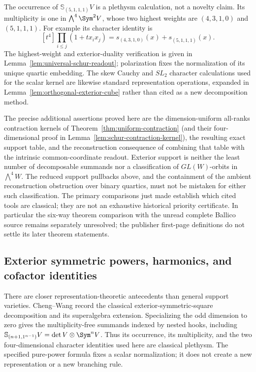 The occurrence of \(\mathbb S_{(5,1,1,1)}V\) is a plethysm
calculation, not a novelty claim.  Its multiplicity is one in
\(\bigwedge^4\Sym^2V\), whose two highest weights are
\((4,3,1,0)\) and \((5,1,1,1)\).  For example its character
identity is
\[
 [t^4]\prod_{i\le j}(1+t x_ix_j)
       =s_{(4,3,1,0)}(x)+s_{(5,1,1,1)}(x).
\]
The highest-weight and exterior-duality verification is given in
Lemma~\ref{lem:universal-schur-readout}; polarization fixes the
normalization of its unique quartic embedding.  The skew Cauchy and
\(SL_2\) character calculations used for the scalar kernel are likewise
standard representation operations, expanded in
Lemma~\ref{lem:orthogonal-exterior-cube} rather than cited as a
new decomposition method.

The precise additional assertions proved here are the dimension-uniform all-ranks
contraction kernels of Theorem~\ref{thm:uniform-contraction}
(and their four-dimensional proof in
Lemma~\ref{lem:schur-contraction-kernel}),
the resulting exact support table, and the reconstruction consequence
of combining that table with the intrinsic common-coordinate
readout.  Exterior support is neither the least number of decomposable
summands nor a classification of \(GL(W)\)-orbits in
\(\bigwedge^4W\).  The reduced support pullbacks above, and the
containment of the ambient reconstruction obstruction over binary
quartics, must not be mistaken for either such classification.
The primary comparisons just made establish which cited tools are
classical; they are not an exhaustive historical priority certificate.
In particular the six-way theorem comparison with the unread
complete Ballico source \cite{Ballico93} remains separately
unresolved; the publisher first-page definitions do not settle its
later theorem statements.

\subsection{Exterior symmetric powers, harmonics, and cofactor identities}

There are closer representation-theoretic antecedents than general
support varieties.  Cheng--Wang \cite[\S2, Theorem 3.5]{ChengWang}
record the classical exterior-symmetric-square decomposition and its
superalgebra extension.  Specializing the odd dimension to zero gives
the multiplicity-free summands indexed by nested hooks, including
\(\mathbb S_{(n+1,1^{n-1})}V=\det V\otimes\Sym^nV\).
Thus its occurrence, its multiplicity, and the two four-dimensional
character identities used here are classical plethysm.  The specified
pure-power formula fixes a scalar normalization; it does not create a
new representation or a new branching rule.

